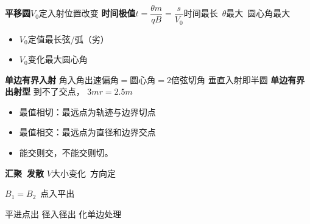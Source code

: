 \textbf{平移圆}\quad $V_0$定\quad 入射位置改变
\textbf{时间极值}\quad $t=\dfrac{\theta m}{qB}=\dfrac{s}{V_0}$\quad 时间最长\ $\theta$最大\ 圆心角最大
\begin{itemize}
\item $V_0$定值\quad 最长弦/弧（劣）
\item $V_0$变化\quad 最大圆心角
\end{itemize}
\textbf{单边有界入射}
角入角出\quad 速偏角$=$圆心角$=2$倍弦切角
\quad {}
垂直入射即半圆
\textbf{单边有界出射型}\quad {}\quad {}
到不了交点，
$3\unit{m}$\quad $r=2.5\unit{m}$
\begin{itemize}
\item 最值相切：最远点为轨迹与边界切点
\item 最值相交：最远点为直径和边界交点
\item 能交则交，不能交则切。
\end{itemize}
\textbf{汇聚\ 发散}
$V$大小变化\ 方向定

$B_1=B_2$\ 点入平出

平进点出
径入径出
化单边处理
